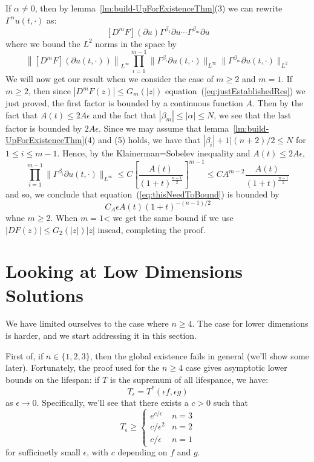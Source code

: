 \documentclass{book}
\newenvironment{Proof}[1][]
  {\begin{ProofTcb}[#1]}
  {\end{ProofTcb}}
\newcommand{\rw}{\rightarrow}
\begin{document}
\begin{Proof}
	If $\alpha \ne 0$, then by lemma~\ref{lm:build-UpForExistenceThm}(3) we can rewrite $\Gamma^\alpha
	u(t,\cdot)$ as:
	\[
		  [D^mF](  \partial u ) \Gamma^{\beta_1}  \partial u\cdots \Gamma^{\beta_m}  \partial u
	  \]
	  where we bound the $L^2$ norms in the space by
	  \begin{equation}\label{eq:thisNeedToBound}
	    \left\| [D^mF]\left(  \partial u(t, \cdot) \right)\right\|_{L^\infty} \prod_{i=1}^{m-1}
		\| \Gamma^{\beta_i}  \partial u(t, \cdot) \|_{L^\infty} \| \Gamma^{\beta_m}  \partial
		u(t, \cdot) \|_{L^2}
	  \end{equation}
	  We will now get our result when we consider the case of $m \ge 2$ and $m = 1$. If $m \ge 2$, then since
	  $|D^mF(z)| \le G_m(|z|)$ equation~(\ref{eq:justEstablishedRes}) we just proved, the first
	  factor is bounded by a continuous function $A$. Then by the fact that $A(t) \le 2A\epsilon$ and the fact
	  that $|\beta_m| \le |\alpha| \le N$, we see that the last factor is bounded by $2A\epsilon$. Since we may
	  assume that lemma~\ref{lm:build-UpForExistenceThm}(4) and (5) holds, we have that $|\beta_i| + 1 | (n+2)/2 \le
	  N$ for $1 \le i \le m-1$. Hence, by the Klainerman=Sobelev inequality and $A(t) \le 2A\epsilon$,
	  \[
		  \prod_{i=1}^{m-1} \| \Gamma^{\beta_i}  \partial u(t, \cdot) \|_{L^\infty} \le C\left[
		  \frac{A(t)}{(1+t)^{\frac{n-1}{2}}}\right]^{m-1} \le CA^{m-2} \frac{A(t)}{(1+t)^{\frac{n-1}{2}}}
	  \]
	  and so, we conclude that equation~(\ref{eq:thisNeedToBound}) is bounded by
	  \[
		  C_A \epsilon A(t)(1+t)^{-(n-1)/2}
	  \]
	  whne $m \ge 2$. When $m = 1$< we get the same bound if we use $|DF(z)| \le G_2(|z|)|z|$ insead, completing
	  the proof.
\end{Proof}

\section{Looking at Low Dimensions Solutions}

We have limited ourselves to the case where $n\ge 4$. The case for lower dimensions is harder, and we start addressing
it in this section.

First of, if $n \in \{1,2,3\}$, then the global existence fails in general (we'll show some later). Fortunately, the
proof used for the $n \ge 4$ case gives asymptotic lower bounds on the lifespan: if $T$ is the supremum of all
lifespance, we have:
\[
	T_\epsilon = T^*(\epsilon f, \epsilon g)
\]
as $\epsilon \rw 0$. Specifically, we'll see that there exists a $c > 0$ such that
\[
	T_\epsilon \ge \begin{cases}
		e^{c/\epsilon} & n = 3\\
		c/\epsilon^2 & n = 2\\
		c/\epsilon & n = 1
	\end{cases}
\]
for sufficinetly small $\epsilon$, with $c$ depending on $f$ and $g$.
\end{document}
